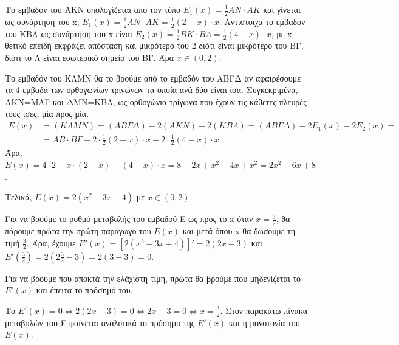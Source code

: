 \begin{alist}
\item 
\begin{rlist}
    \item Το εμβαδόν του ΑΚΝ υπολογίζεται από τον τύπο $E_1(x) = \frac{1}{2}AN \cdot AK$ και γίνεται ως συνάρτηση του x, $E_1(x) = \frac{1}{2}AN \cdot AK = \frac{1}{2}(2-x) \cdot x$. Αντίστοιχα το εμβαδόν του ΚΒΛ ως συνάρτηση του x είναι $E_2(x) = \frac{1}{2}BK \cdot B\Lambda = \frac{1}{2}(4-x) \cdot x$, με x θετικό επειδή εκφράζει απόσταση και μικρότερο του 2 διότι είναι μικρότερο του ΒΓ, διότι το Λ είναι εσωτερικό σημείο του ΒΓ. Άρα $x \in (0,2)$.
    
    \item Το εμβαδόν του ΚΛΜΝ θα το βρούμε από το εμβαδόν του ΑΒΓΔ αν αφαιρέσουμε τα 4 εμβαδά των ορθογωνίων τριγώνων τα οποία ανά δύο είναι ίσα. Συγκεκριμένα, ΑΚΝ=ΜΛΓ και ΔΜΝ=ΚΒΛ, ως ορθογώνια τρίγωνα που έχουν τις κάθετες πλευρές τους ίσες, μία προς μία.
    \[
    \begin{aligned}
    E(x) &= (K\Lambda MN) = (AB\Gamma\Delta) - 2(AKN) - 2(KB\Lambda) = (AB\Gamma\Delta) - 2E_1(x) - 2E_2(x) = \\
    &= AB \cdot B\Gamma - 2 \cdot \frac{1}{2}(2-x) \cdot x - 2 \cdot \frac{1}{2}(4-x) \cdot x
    \end{aligned}
    \]
    Άρα, $E(x) = 4 \cdot 2 - x \cdot (2 - x) - (4 - x) \cdot x = 8 - 2x + x^2 - 4x + x^2 = 2x^2 - 6x + 8$.
    
    Τελικά, $E(x) = 2(x^2 - 3x + 4)$ με $x \in (0,2)$.
\end{rlist}

\item Για να βρούμε το ρυθμό μεταβολής του εμβαδού Ε ως προς το x όταν $x = \frac{3}{2}$, θα πάρουμε πρώτα την πρώτη παράγωγο του $E(x)$ και μετά όπου x θα δώσουμε τη τιμή $\frac{3}{2}$. Άρα, έχουμε $E'(x) = [2(x^2 - 3x + 4)]' = 2(2x - 3)$ και $E'\left(\frac{3}{2}\right) = 2\left(2\frac{3}{2} - 3\right) = 2(3 - 3) = 0$.

\item Για να βρούμε που αποκτά την ελάχιστη τιμή, πρώτα θα βρούμε που μηδενίζεται το $E'(x)$ και έπειτα το πρόσημό του.

Το $E'(x) = 0 \Leftrightarrow 2(2x - 3) = 0 \Leftrightarrow 2x - 3 = 0 \Leftrightarrow x = \frac{3}{2}$. Στον παρακάτω πίνακα μεταβολών του Ε φαίνεται αναλυτικά το πρόσημο της $E'(x)$ και η μονοτονία του $E(x)$.

\begin{center}
\end{center}


\end{alist}
